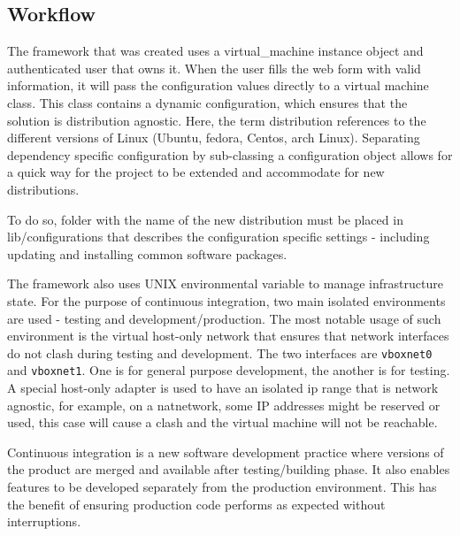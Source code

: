\documentclass{article}
\begin{document}
\subsection{Workflow}
The framework that was created uses a \gls{virtual_machine} instance object and authenticated user that owns it. When the user fills the web form with valid information, it will pass the configuration values directly to a virtual machine class. This class contains a dynamic configuration, which ensures that the solution is distribution agnostic. Here, the term distribution references to the different versions of Linux (Ubuntu, fedora, Centos, arch Linux). Separating dependency specific configuration by sub-classing a configuration object allows for a quick way for the project to be extended and accommodate for new distributions.

To do so, folder with the name of the new distribution must be placed in lib/configurations that describes the configuration specific settings - including updating and installing common software packages.

The framework also uses UNIX environmental variable to manage infrastructure state. For the  purpose of continuous integration, two main isolated environments are used - testing and development/production.
The most notable usage of such environment is the virtual host-only network that ensures that network interfaces do not clash during testing and development. The two interfaces are \texttt{vboxnet0} and \texttt{vboxnet1}. One is for general purpose development, the another is for testing. A special host-only adapter is used to have an isolated ip range that is network agnostic, for example, on a \gls{natnetwork}, some IP addresses might be reserved or used, this case will cause a clash and the virtual machine will not be reachable.

Continuous integration is a new software development practice where versions of the product are merged and available after testing/building phase. It also enables features to be developed separately from the production environment. This has the benefit of ensuring production code performs as expected without interruptions.
\end{document}
